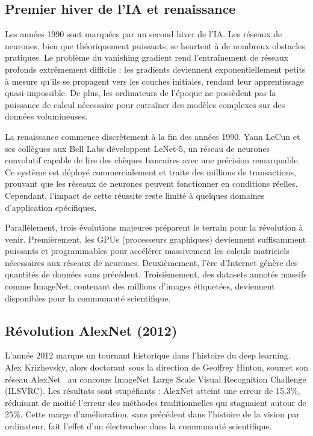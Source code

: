 \subsection{Premier hiver de l'IA et renaissance}

Les années 1990 sont marquées par un second hiver de l'IA. Les réseaux de neurones, bien que théoriquement puissants, se heurtent à de nombreux obstacles pratiques. Le problème du vanishing gradient rend l'entraînement de réseaux profonds extrêmement difficile : les gradients deviennent exponentiellement petits à mesure qu'ils se propagent vers les couches initiales, rendant leur apprentissage quasi-impossible. De plus, les ordinateurs de l'époque ne possèdent pas la puissance de calcul nécessaire pour entraîner des modèles complexes sur des données volumineuses.

La renaissance commence discrètement à la fin des années 1990. Yann LeCun et ses collègues aux Bell Labs développent LeNet-5, un réseau de neurones convolutif capable de lire des chèques bancaires avec une précision remarquable. Ce système est déployé commercialement et traite des millions de transactions, prouvant que les réseaux de neurones peuvent fonctionner en conditions réelles. Cependant, l'impact de cette réussite reste limité à quelques domaines d'application spécifiques.

Parallèlement, trois évolutions majeures préparent le terrain pour la révolution à venir. Premièrement, les GPUs (processeurs graphiques) deviennent suffisamment puissants et programmables pour accélérer massivement les calculs matriciels nécessaires aux réseaux de neurones. Deuxièmement, l'ère d'Internet génère des quantités de données sans précédent. Troisièmement, des datasets annotés massifs comme ImageNet, contenant des millions d'images étiquetées, deviennent disponibles pour la communauté scientifique.

\subsection{Révolution AlexNet (2012)}

L'année 2012 marque un tournant historique dans l'histoire du deep learning. Alex Krizhevsky, alors doctorant sous la direction de Geoffrey Hinton, soumet son réseau AlexNet~\cite{Krizhevsky2012} au concours ImageNet Large Scale Visual Recognition Challenge (ILSVRC). Les résultats sont stupéfiants : AlexNet atteint une erreur de 15.3\%, réduisant de moitié l'erreur des méthodes traditionnelles qui stagnaient autour de 25\%. Cette marge d'amélioration, sans précédent dans l'histoire de la vision par ordinateur, fait l'effet d'un électrochoc dans la communauté scientifique.

